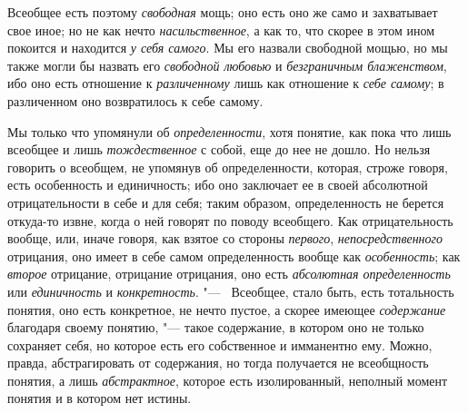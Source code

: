 {Всеобщее есть поэтому
{\em свободная} мощь; оно
есть оно же само и захватывает свое иное; но не как нечто
{\em насильственное}, а
как то, что скорее в этом ином покоится и находится
{\em у себя самого}. Мы
его назвали свободной мощью, но мы также могли бы назвать его
{\em свободной любовью} и
{\em безграничным блаженством},
ибо оно есть отношение к
{\em различенному} лишь
как отношение к {\em себе самому};
в различенном оно возвратилось к себе самому.

Мы только что упомянули об
{\em определенности},
хотя понятие, как пока что лишь всеобщее и лишь
{\em тождественное} с
собой, еще до нее не дошло. Но нельзя говорить о всеобщем, не упомянув об
определенности, которая, строже говоря, есть особенность и единичность; ибо
оно заключает ее в своей абсолютной отрицательности в себе и для себя;
таким образом, определенность не берется откуда-то извне, когда о ней
говорят по поводу всеобщего. Как отрицательность вообще, или, иначе говоря,
как взятое со стороны {\em первого},
{\em непосредственного}
отрицания, оно имеет в себе самом
определенность вообще как
{\em особенность}; как
{\em второе} отрицание,
отрицание отрицания, оно есть
{\em абсолютная определенность}
или {\em единичность}
и {\em конкретность}. "---
\ Всеобщее, стало быть, есть тотальность понятия, оно есть
конкретное, не нечто пустое, а скорее имеющее
{\em содержание}
благодаря своему понятию, "--- такое содержание,
в котором оно не только сохраняет себя, но которое есть его собственное и
имманентно ему. Можно, правда, абстрагировать от содержания, но тогда
получается не всеобщность понятия, а лишь
{\em абстрактное},
которое есть изолированный, неполный момент понятия и в
котором нет истины.

}

